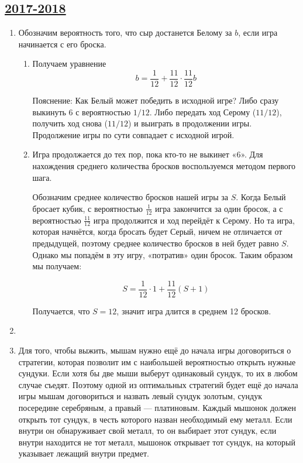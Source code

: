 \subsection[2017-2018]{\hyperref[sec:kr_01_ip_2017_2018]{2017-2018}}
\label{sec:sol_kr_01_ip_2017_2018}

\begin{enumerate}
\item Обозначим вероятность того, что сыр достанется Белому за $b$, если игра
начинается с его броска.

\begin{enumerate}
\item Получаем уравнение
\[
b = \frac{1}{12} + \frac{11}{12} \cdot \frac{11}{12} b
\]

Пояснение: Как Белый может победить в исходной игре? Либо сразу выкинуть 6 с вероятностью $1/12$.
Либо передать ход Серому ($11/12$), получить ход снова ($11/12$) и выиграть в продолжении игры.
Продолжение игры по сути совпадает с исходной игрой.

\item Игра продолжается до тех пор, пока кто-то не выкинет «6».
Для нахождения среднего количества бросков воспользуемся методом первого шага.

Обозначим среднее количество бросков нашей игры за $S$.
Когда Белый бросает кубик, с вероятностью $\frac{1}{12}$ игра закончится за один бросок,
а с вероятностью $\frac{11}{12}$ игра продолжится и ход перейдёт к Серому.
Но та игра, которая начнётся, когда бросать будет Серый, ничем не отличается от предыдущей,
поэтому среднее количество бросков в ней будет равно $S$.
Однако мы попадём в эту игру, «потратив» один бросок. Таким образом мы получаем:

\[
S = \frac{1}{12} \cdot 1 + \frac{11}{12}(S +1)
\]

Получается, что $S = 12$, значит игра длится в среднем 12 бросков.
\end{enumerate}

\item

\item Для того, чтобы выжить, мышам нужно ещё до начала игры договориться о стратегии,
которая позволит им с наибольшей вероятностью открыть нужные сундуки.
Если хотя бы две мыши выберут одинаковый сундук, то их в любом случае съедят.
Поэтому одной из оптимальных стратегий будет ещё до начала игры мышам договориться
и назвать левый сундук золотым, сундук посередине серебряным, а правый — платиновым.
Каждый мышонок должен открыть тот сундук, в честь которого назван необходимый ему металл.
Если внутри он обнаруживает свой металл, то он выбирает этот сундук,
если внутри находится не тот металл, мышонок открывает тот сундук,
на который указывает лежащий внутри предмет.


\end{enumerate}
